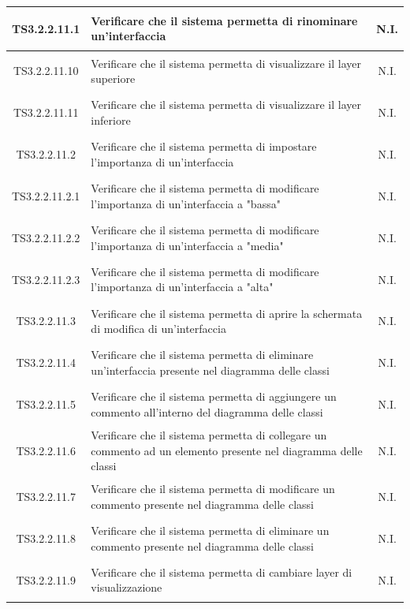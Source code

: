 \documentclass[../PianoDiQualifica.tex]{subfiles}
\begin{document}
\begin{longtable}{|c|>{\centering}p{10cm}|c|}
	\hline
	\hypertarget{TS3.2.2.11.1}{TS3.2.2.11.1} & Verificare che il sistema permetta di rinominare un'interfaccia & N.I. \\
	\hline
	\hypertarget{TS3.2.2.11.10}{TS3.2.2.11.10} & Verificare che il sistema permetta di visualizzare il layer superiore & N.I. \\
	\hline
	\hypertarget{TS3.2.2.11.11}{TS3.2.2.11.11} & Verificare che il sistema permetta di visualizzare il layer inferiore & N.I. \\
	\hline
	\hypertarget{TS3.2.2.11.2}{TS3.2.2.11.2} & Verificare che il sistema permetta di impostare l'importanza di un'interfaccia & N.I. \\
	\hline
	\hypertarget{TS3.2.2.11.2.1}{TS3.2.2.11.2.1} & Verificare che il sistema permetta di modificare l'importanza di un'interfaccia a "bassa" & N.I. \\
	\hline
	\hypertarget{TS3.2.2.11.2.2}{TS3.2.2.11.2.2} & Verificare che il sistema permetta di modificare l'importanza di un'interfaccia a "media" & N.I. \\
	\hline
	\hypertarget{TS3.2.2.11.2.3}{TS3.2.2.11.2.3} & Verificare che il sistema permetta di modificare l'importanza di un'interfaccia a "alta" & N.I. \\
	\hline
	\hypertarget{TS3.2.2.11.3}{TS3.2.2.11.3} & Verificare che il sistema permetta di aprire la schermata di modifica di un'interfaccia & N.I. \\
	\hline
	\hypertarget{TS3.2.2.11.4}{TS3.2.2.11.4} & Verificare che il sistema permetta di eliminare un'interfaccia presente nel diagramma delle classi & N.I. \\
	\hline
	\hypertarget{TS3.2.2.11.5}{TS3.2.2.11.5} & Verificare che il sistema permetta di aggiungere un commento all'interno del diagramma delle classi & N.I. \\
	\hline
	\hypertarget{TS3.2.2.11.6}{TS3.2.2.11.6} & Verificare che il sistema permetta di collegare un commento ad un elemento presente nel diagramma delle classi & N.I. \\
	\hline
	\hypertarget{TS3.2.2.11.7}{TS3.2.2.11.7} & Verificare che il sistema permetta di modificare un commento presente nel diagramma delle classi & N.I. \\
	\hline
	\hypertarget{TS3.2.2.11.8}{TS3.2.2.11.8} & Verificare che il sistema permetta di eliminare un commento presente nel diagramma delle classi & N.I. \\
	\hline
	\hypertarget{TS3.2.2.11.9}{TS3.2.2.11.9} & Verificare che il sistema permetta di cambiare layer di visualizzazione & N.I. \\

\end{longtable}
\end{document}
